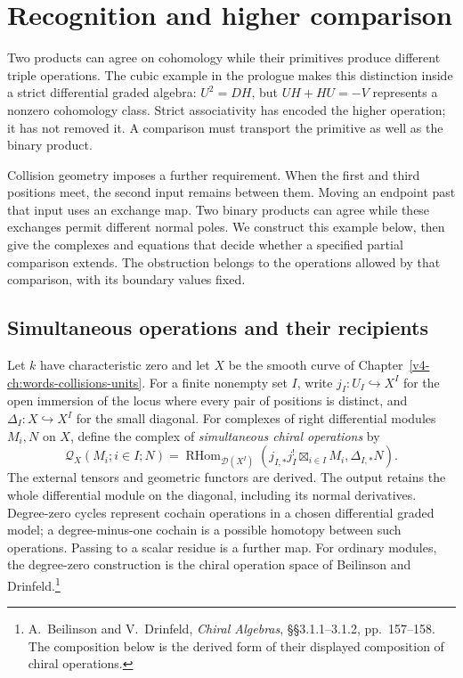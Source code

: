 \chapter{Recognition and higher comparison}
\label{v4-ch:recognition-higher-comparison}

Two products can agree on cohomology while their primitives
produce different triple operations. The cubic example in the
prologue makes this distinction inside a strict differential
graded algebra: \(U^2=DH\), but
\(UH+HU=-V\) represents a nonzero cohomology class. Strict
associativity has encoded the higher operation; it has not
removed it. A comparison must transport the primitive as well as
the binary product.

Collision geometry imposes a further requirement. When the first
and third positions meet, the second input remains between them.
Moving an endpoint past that input uses an exchange map. Two
binary products can agree while these exchanges permit different
normal poles. We construct this example below, then give the
complexes and equations that decide whether a specified partial
comparison extends. The obstruction belongs to the operations
allowed by that comparison, with its boundary values fixed.

\section{Simultaneous operations and their recipients}
\label{v4-sec:recognition-operations}

Let \(k\) have characteristic zero and let \(X\) be the smooth
curve of Chapter~\ref{v4-ch:words-collisions-units}. For a finite
nonempty set \(I\), write
\(j_I:U_I\hookrightarrow X^I\) for the open immersion of the
locus where every pair of positions is distinct, and
\(\Delta_I:X\hookrightarrow X^I\) for the small diagonal.
For complexes of right differential modules \(M_i,N\) on \(X\),
define the complex of \emph{simultaneous chiral operations} by
\begin{equation}\label{v4-eq:recognition-chiral-operations}
 \mathcal Q_X(M_i;i\in I;N)
  =\operatorname{RHom}_{\mathcal D(X^I)}
       \left(j_{I,*}j_I^!\!\mathop{\boxtimes}_{i\in I}M_i,
                         \Delta_{I,*}N\right).
\end{equation}
The external tensors and geometric functors are derived. The
output retains the whole differential module on the diagonal,
including its normal derivatives. Degree-zero cycles represent
cochain operations in a chosen differential graded model; a
degree-minus-one cochain is a possible homotopy between such
operations. Passing to a scalar residue is a further map.
For ordinary modules, the degree-zero construction is the chiral
operation space of Beilinson and Drinfeld.\footnote{
A.~Beilinson and V.~Drinfeld, \emph{Chiral Algebras},
\S\S3.1.1--3.1.2, pp.~157--158. The composition below is the
derived form of their displayed composition of chiral operations.}

